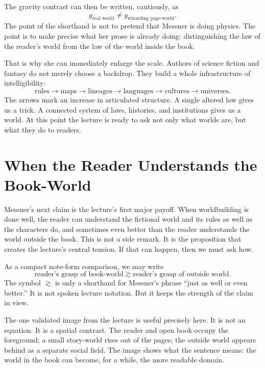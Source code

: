 The gravity contrast can then be written, cautiously, as
\begin{equation}
g_{\text{real world}} \neq g_{\text{wizarding page-world}}.
\end{equation}
The point of the shorthand is not to pretend that Messner is doing physics. The point is to make precise what her prose is already doing: distinguishing the law of the reader's world from the law of the world inside the book.

That is why she can immediately enlarge the scale. Authors of science fiction and fantasy do not merely choose a backdrop. They build a whole infrastructure of intelligibility:
\begin{equation}
\text{rules} \to \text{maps} \to \text{lineages} \to \text{languages} \to \text{cultures} \to \text{universes}.
\end{equation}
The arrows mark an increase in articulated structure. A single altered law gives us a trick. A connected system of laws, histories, and institutions gives us a world. At this point the lecture is ready to ask not only what worlds are, but what they do to readers.

\section{When the Reader Understands the Book-World}

Messner's next claim is the lecture's first major payoff. When worldbuilding is done well, the reader can understand the fictional world and its rules as well as the characters do, and sometimes even better than the reader understands the world outside the book. This is not a side remark. It is the proposition that creates the lecture's central tension. If that can happen, then we must ask how.

As a compact note-form comparison, we may write
\begin{equation}
\text{reader's grasp of book-world} \gtrsim \text{reader's grasp of outside world}.
\end{equation}
The symbol \(\gtrsim\) is only a shorthand for Messner's phrase ``just as well or even better.'' It is not spoken lecture notation. But it keeps the strength of the claim in view.

The one validated image from the lecture is useful precisely here. It is not an equation. It is a spatial contrast. The reader and open book occupy the foreground; a small story-world rises out of the pages; the outside world appears behind as a separate social field. The image shows what the sentence means: the world in the book can become, for a while, the more readable domain.


